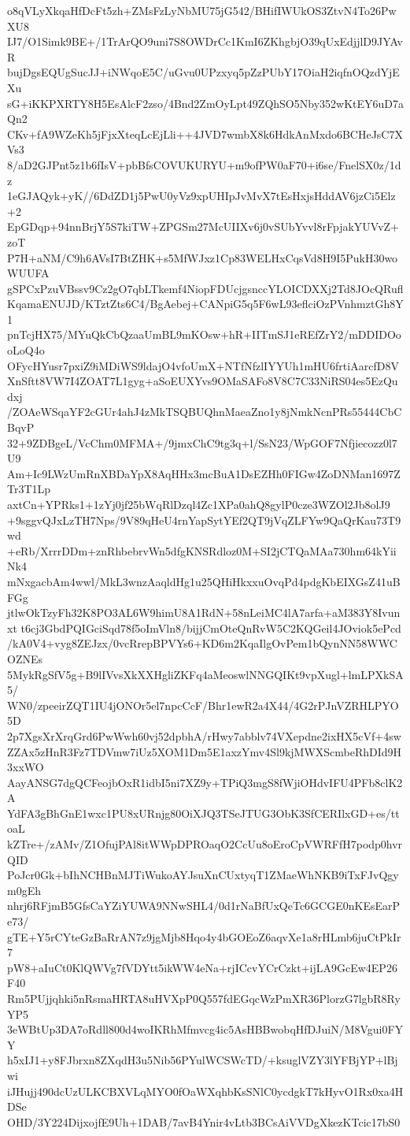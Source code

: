 o8qVLyXkqaHfDcFt5zh+ZMsFzLyNbMU75jG542/BHifIWUkOS3ZtvN4To26PwXU8
IJ7/O1Simk9BE+/1TrArQO9uni7S8OWDrCc1KmI6ZKhgbjO39qUxEdjjlD9JYAvR
bujDgsEQUgSucJJ+iNWqoE5C/uGvu0UPzxyq5pZzPUbY17OiaH2iqfnOQzdYjEXu
sG+iKKPXRTY8H5EsAlcF2zso/4Bnd2ZmOyLpt49ZQhSO5Nby352wKtEY6uD7aQn2
CKv+fA9WZeKh5jFjxXteqLcEjLli++4JVD7wmbX8k6HdkAnMxdo6BCHeJsC7XVs3
8/aD2GJPnt5z1b6fIsV+pbBfsCOVUKURYU+m9ofPW0aF70+i6se/FnelSX0z/1dz
1eGJAQyk+yK//6DdZD1j5PwU0yVz9xpUHIpJvMvX7tEsHxjsHddAV6jzCi5Elz+2
EpGDqp+94nnBrjY5S7kiTW+ZPGSm27McUIIXv6j0vSUbYvvl8rFpjakYUVvZ+zoT
P7H+aNM/C9h6AVsI7BtZHK+s5MfWJxz1Cp83WELHxCqsVd8H9I5PukH30woWUUFA
gSPCxPzuVBssv9Cz2gO7qbLTkemf4NiopFDUcjgsnccYLOICDXXj2Td8JOcQRufl
KqamaENUJD/KTztZts6C4/BgAebej+CANpiG5q5F6wL93eflciOzPVnhmztGh8Y1
pnTcjHX75/MYuQkCbQzaaUmBL9mKOsw+hR+IITmSJ1eREfZrY2/mDDIDOooLoQ4o
OFycHYusr7pxiZ9iMDiWS9ldajO4vfoUmX+NTfNfzlIYYUh1mHU6frtiAarcfD8V
XnSftt8VW7I4ZOAT7L1gyg+aSoEUXYvs9OMaSAFo8V8C7C33NiRS04es5EzQudxj
/ZOAeWSqaYF2cGUr4ahJ4zMkTSQBUQhnMaeaZno1y8jNmkNcnPRs55444CbCBqvP
32+9ZDBgeL/VcChm0MFMA+/9jmxChC9tg3q+l/SsN23/WpGOF7Nfjiecozz0l7U9
Am+Ic9LWzUmRnXBDaYpX8AqHHx3mcBuA1DsEZHh0FIGw4ZoDNMan1697ZTr3T1Lp
axtCn+YPRks1+1zYj0jf25bWqRlDzql4Zc1XPa0ahQ8gylP0cze3WZOl2Jb8olJ9
+9sggvQJxLzTH7Nps/9V89qHeU4rnYapSytYEf2QT9jVqZLFYw9QaQrKau73T9wd
+eRb/XrrrDDm+znRhbebrvWn5dfgKNSRdloz0M+SI2jCTQaMAa730hm64kYiiNk4
mNxgacbAm4wwl/MkL3wnzAaqldHg1u25QHiHkxxuOvqPd4pdgKbEIXGsZ41uBFGg
jtlwOkTzyFh32K8PO3AL6W9himU8A1RdN+58nLeiMC4lA7arfa+aM383Y8Ivunxt
t6cj3GbdPQIGciSqd78f5oImVln8/bijjCmOteQnRvW5C2KQGeil4JOviok5ePcd
/kA0V4+vyg8ZEJzx/0vcRrepBPVYs6+KD6m2KqaIlgOvPem1bQynNN58WWCOZNEs
5MykRgSfV5g+B9lIVvsXkXXHgliZKFq4aMeoswlNNGQIKt9vpXugl+lmLPXkSA5/
WN0/zpeeirZQT1IU4jONOr5el7npcCcF/Bhr1ewR2a4X44/4G2rPJnVZRHLPYO5D
2p7XgsXrXrqGrd6PwWwh60vj52dpbhA/rHwy7abblv74VXepdne2ixHX5cVf+4sw
ZZAx5zHnR3Fz7TDVmw7iUz5XOM1Dm5E1axzYmv4Sl9kjMWXScmbeRhDId9H3xxWO
AayANSG7dgQCFeojbOxR1idbI5ni7XZ9y+TPiQ3mgS8fWjiOHdvIFU4PFb8clK2A
YdFA3gBhGnE1wxc1PU8xURnjg80OiXJQ3TSeJTUG3ObK3SfCERIlxGD+es/ttoaL
kZTre+/zAMv/Z1OfujPAl8itWWpDPROaqO2CcUu8oEroCpVWRFfH7podp0hvrQID
PoJcr0Gk+bIhNCHBnMJTiWukoAYJsuXnCUxtyqT1ZMaeWhNKB9iTxFJvQgym0gEh
nhrj6RFjmB5GfsCaYZiYUWA9NNwSHL4/0d1rNaBfUxQeTc6GCGE0nKEsEarPe73/
gTE+Y5rCYteGzBaRrAN7z9jgMjb8Hqo4y4bGOEoZ6aqvXe1a8rHLmb6juCtPkIr7
pW8+aIuCt0KlQWVg7fVDYtt5ikWW4eNa+rjICcvYCrCzkt+ijLA9GcEw4EP26F40
Rm5PUjjqhki5nRsmaHRTA8uHVXpP0Q557fdEGqcWzPmXR36PlorzG7lgbR8RyYP5
3eWBtUp3DA7oRdll800d4woIKRhMfmvcg4ic5AsHBBwobqHfDJuiN/M8Vgui0FYY
h5xIJ1+y8FJbrxn8ZXqdH3u5Nib56PYulWCSWcTD/+ksuglVZY3lYFBjYP+lBjwi
iJHujj490dcUzULKCBXVLqMYO0fOaWXqhbKsSNlC0ycdgkT7kHyvO1Rx0xa4HDSe
OHD/3Y224DijxojfE9Uh+1DAB/7avB4Ynir4vLtb3BCsAiVVDgXkezKTcic17bS0
